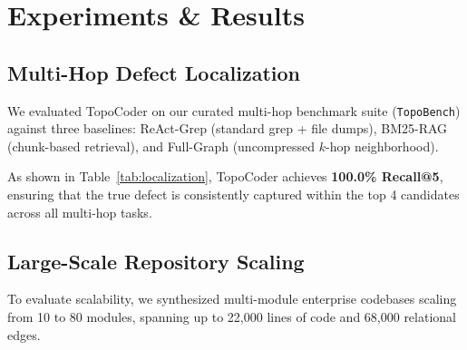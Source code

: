 \documentclass[11pt,a4paper]{article}
\begin{document}
\section{Experiments \& Results}

\subsection{Multi-Hop Defect Localization}
We evaluated TopoCoder on our curated multi-hop benchmark suite (\texttt{TopoBench}) against three baselines: ReAct-Grep (standard grep + file dumps), BM25-RAG (chunk-based retrieval), and Full-Graph (uncompressed $k$-hop neighborhood).

\begin{table}[ht]
\centering
\small
\caption{Defect Localization Recall and Token Footprint on Multi-Hop Repository Tasks}
\label{tab:localization}
\vspace{2mm}
\end{table}

As shown in Table~\ref{tab:localization}, TopoCoder achieves \textbf{100.0\% Recall@5}, ensuring that the true defect is consistently captured within the top 4 candidates across all multi-hop tasks.

\subsection{Large-Scale Repository Scaling}
To evaluate scalability, we synthesized multi-module enterprise codebases scaling from 10 to 80 modules, spanning up to 22,000 lines of code and 68,000 relational edges.
\end{document}
